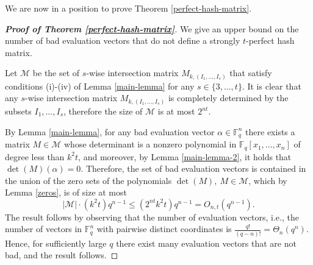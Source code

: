 \documentclass[11pt]{article}
\newcommand\black[1]{{\color{black} #1}}
\begin{document}
We are now in a position to prove Theorem \ref{perfect-hash-matrix}.

\begin{proof}[\textbf{Proof of Theorem \ref{perfect-hash-matrix}}]
We give an upper bound on the number of bad evaluation vectors that do not define a strongly $t$-perfect hash matrix.

Let $\mathcal{M}$ be the set of  $s$-wise intersection matrix $M_{k,(I_1,\ldots,I_{s})}$ that satisfy conditions {\rm (i)}-{\rm (iv)} of Lemma \ref{main-lemma} for any $s\in \{3,\ldots, t\}$.
It is clear that any  $s$-wise intersection matrix $M_{k,(I_1,\ldots,I_s)}$ is completely determined by the subsets $I_1,\ldots,I_s$, therefore the size of $\mathcal{M}$    is at most  $2^{nt}$.

 By Lemma \ref{main-lemma}, for any bad evaluation vector $\alpha\in\mathbb{F}_q^n$ there exists a matrix $M\in\mathcal{M}$ whose determinant is a nonzero polynomial in $\mathbb{F}_q[x_1,\ldots,x_n]$ of degree less than $k^2t$, \black{and moreover},  by Lemma \ref{main-lemma-2}, it holds that $\det(M)(\alpha)=0$. Therefore, the set of bad evaluation vectors is contained in the union of the zero sets of the polynomials $\det(M),~M\in\mathcal{M}$, which by Lemma \ref{zeros}, is of size at most
$$|\mathcal{M}|\cdot(k^2t)q^{n-1}\le (2^{nt}k^2t)q^{n-1}=O_{n,t}(q^{n-1}).$$
The result follows by observing that the number of evaluation vectors, i.e., the number of  vectors in $\mathbb{F}_q^n$ with pairwise distinct coordinates is  $\frac{q!}{(q-n)!}=\Theta_n(q^n)$. Hence, for sufficiently large $q$ there exist many evaluation vectors that are not bad, and the result follows.
\end{proof}
\end{document}
